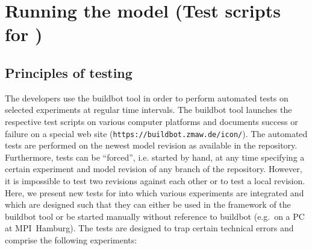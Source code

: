 \section{Running the model (Test scripts for \icon)}\label{sec_cr20140130rjs_test}

\subsection{Principles of testing
  \icon}\label{sec_cr2014_01_30_rjs_principles} 

The \icon{} developers use the buildbot tool in order to perform
automated tests on selected \icon{} experiments at regular time
intervals. The buildbot tool launches the respective test scripts on
various computer platforms and documents success or failure on a special web
site ({\tt https://buildbot.zmaw.de/icon/}). The automated tests are
performed on the newest model revision as available in the \icon{}
repository. Furthermore, tests can be ``forced'', i.e. started by
hand, at any time specifying a certain experiment and model revision
of any branch of the repository. However, it is impossible to test two
revisions against each other or to test a local revision.
Here, we present new tests for \icon{} into which various experiments
are integrated and which are designed
such that they can either be used in the framework of the buildbot
tool or be started manually without reference to buildbot (e.g.~on
a PC at MPI~Hamburg). The tests are designed to trap certain technical
errors and comprise the following experiments:
